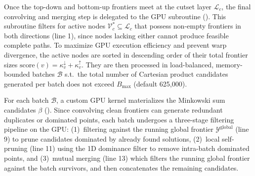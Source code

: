 \documentclass[letterpaper]{article}
\begin{document}
Once the top-down and bottom-up frontiers meet at the cutset layer $\mathcal{L}_c$, the final convolving and merging step is delegated to the GPU subroutine  (). This subroutine filters for active nodes $\mathcal{V}^*_c \subseteq \mathcal{L}_c$ that possess non-empty frontiers in both directions (line 1), since nodes lacking either cannot produce feasible complete paths. To maximize GPU execution efficiency and prevent warp divergence, the active nodes are sorted in descending order of their total frontier sizes $\text{score}(v) = \kappa^{\downarrow}_v + \kappa^{\uparrow}_v$. They are then processed in load-balanced, memory-bounded batches $\mathcal{B}$ s.t.\ the total number of Cartesian product candidates generated per batch does not exceed $B_{\max}$ (default 625,000).

For each batch $\mathcal{B}$, a custom GPU kernel materializes the Minkowski sum candidates $\beta$ (). Since convolving clean frontiers can generate redundant duplicates or dominated points, each batch undergoes a three-stage filtering pipeline on the GPU: (1)~filtering against the running global frontier $\mathcal{Y}^{\text{global}}$ (line 9) to prune candidates dominated by already found solutions, (2)~local self-pruning (line 11) using the 1D dominance filter to remove intra-batch dominated points, and (3)~mutual merging (line 13) which filters the running global frontier against the batch survivors, and then concatenates the remaining candidates.
\end{document}
